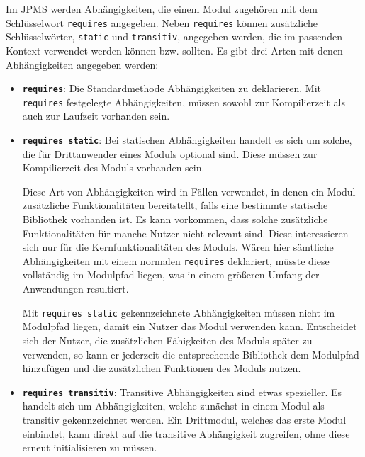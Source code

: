 Im JPMS werden Abhängigkeiten, die einem Modul zugehören mit dem Schlüsselwort \texttt{requires} angegeben. 
Neben \texttt{requires} können zusätzliche Schlüsselwörter, \texttt{static} und \texttt{transitiv}, angegeben werden, die im passenden Kontext verwendet werden können bzw. sollten. 
Es gibt drei Arten mit denen Abhängigkeiten angegeben werden:

\begin{itemize}
	\item \textbf{\texttt{requires}}: 
	Die Standardmethode Abhängigkeiten zu deklarieren.
	Mit \texttt{requires} festgelegte Abhängigkeiten, müssen sowohl zur Kompilierzeit als auch zur Laufzeit vorhanden sein.
	
	\item \textbf{\texttt{requires static}}: 
	Bei statischen Abhängigkeiten handelt es sich um solche, die für Drittanwender eines Moduls optional sind.
	Diese müssen zur Kompilierzeit des Moduls vorhanden sein. 
	
	Diese Art von Abhängigkeiten wird in Fällen verwendet, in denen ein Modul zusätzliche Funktionalitäten bereitstellt, falls eine bestimmte statische Bibliothek vorhanden ist. 
	Es kann vorkommen, dass solche zusätzliche Funktionalitäten für manche Nutzer nicht relevant sind.
	Diese interessieren sich nur für die Kernfunktionalitäten des Moduls. 
	Wären hier sämtliche Abhängigkeiten mit einem normalen \texttt{requires} deklariert, müsste diese vollständig im Modulpfad liegen, was in einem größeren Umfang der Anwendungen resultiert.
	
	Mit \texttt{requires static} gekennzeichnete Abhängigkeiten müssen nicht im Modulpfad liegen, damit ein Nutzer das Modul verwenden kann.
	Entscheidet sich der Nutzer, die zusätzlichen Fähigkeiten des Moduls später zu verwenden, so kann er jederzeit die entsprechende Bibliothek dem Modulpfad hinzufügen und die zusätzlichen Funktionen des Moduls nutzen.
	
	\item \textbf{\texttt{requires transitiv}}: 
	Transitive Abhängigkeiten sind etwas spezieller.
	Es handelt sich um Abhängigkeiten, welche zunächst in einem Modul als transitiv gekennzeichnet werden. 
	Ein Drittmodul, welches das erste Modul einbindet, kann direkt auf die transitive Abhängigkeit zugreifen, ohne diese erneut initialisieren zu müssen.
	
	
\end{itemize}

